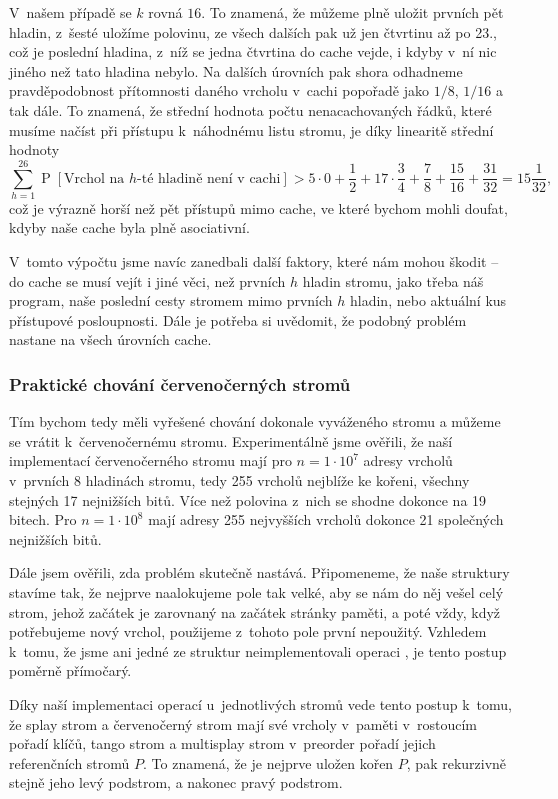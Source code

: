 V~našem případě se $k$ rovná $16$. To znamená, že můžeme plně uložit prvních pět hladin,
z~šesté uložíme polovinu, ze všech dalších pak už jen čtvrtinu až po 23., což je
poslední hladina, z~níž se jedna čtvrtina do cache vejde, i kdyby v~ní nic
jiného než tato hladina nebylo. Na dalších úrovních pak shora odhadneme
pravděpodobnost přítomnosti daného vrcholu v~cachi popořadě jako $1/8$, $1/16$
a tak dále. To znamená, že střední hodnota počtu nenacachovaných řádků, které
musíme načíst při přístupu k~náhodnému listu stromu, je díky linearitě střední
hodnoty $$\sum_{h=1}^{26} \operatorname{P}[\text{Vrchol na $h$-té hladině není v
cachi}] > 5 \cdot 0 +  \frac 12 + 17\cdot \frac34 + \frac78 + \frac{15}{16} + \frac{31}{32} = 15\frac1{32},$$ což je výrazně horší než pět přístupů mimo cache, ve které bychom mohli doufat, kdyby naše cache byla plně asociativní.   

V~tomto výpočtu jsme navíc
zanedbali další faktory, které nám mohou škodit -- do cache se musí vejít i
jiné věci, než prvních $h$ hladin stromu, jako třeba náš program, naše poslední
cesty stromem mimo prvních $h$ hladin, nebo aktuální kus přístupové
posloupnosti. Dále je potřeba si uvědomit, že podobný problém nastane na všech
úrovních cache.

\subsubsection{Praktické chování červenočerných stromů}

Tím bychom tedy měli vyřešené chování dokonale vyváženého stromu a můžeme se
vrátit k~červenočernému stromu. Experimentálně jsme ověřili, že naší
implementací červenočerného stromu mají pro $n=1\cdot 10^7$  adresy vrcholů
v~prvních 8 hladinách stromu, tedy 255 vrcholů nejblíže ke kořeni, všechny
stejných 17 nejnižších bitů. Více než polovina z~nich se shodne dokonce na 19
bitech. Pro $n=1\cdot10^8$ mají adresy 255 nejvyšších vrcholů dokonce 21
společných nejnižších bitů.   

Dále jsem ověřili, zda problém skutečně nastává. Připomeneme, že naše struktury stavíme tak, že nejprve naalokujeme pole tak velké, aby se nám do něj vešel celý strom, jehož začátek je zarovnaný na začátek stránky paměti, a poté vždy, když potřebujeme nový vrchol, použijeme z~tohoto pole první nepoužitý. Vzhledem k~tomu, že jsme ani jedné ze struktur neimplementovali operaci , je tento postup poměrně přímočarý.

Díky naší implementaci operací  u~jednotlivých stromů vede tento postup k~tomu, že splay strom a červenočerný strom mají své vrcholy v~paměti v~rostoucím pořadí klíčů, tango strom a multisplay strom v~preorder pořadí jejich referenčních stromů $P$. To znamená, že je nejprve uložen kořen $P$, pak rekurzivně stejně jeho levý podstrom, a nakonec pravý podstrom.


